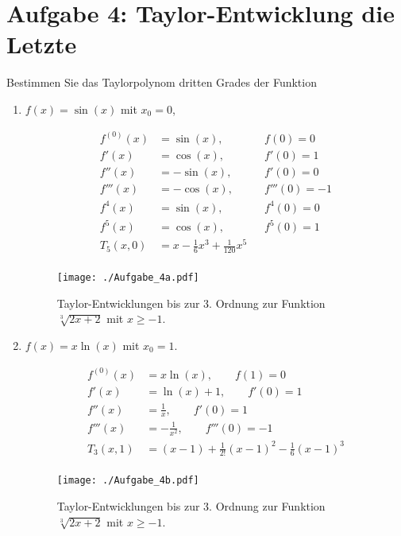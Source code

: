 \documentclass[11pt,a4paper, parskip=half ]{report}
\begin{document}
  \section*{Aufgabe 4:  Taylor-Entwicklung die Letzte}
  Bestimmen Sie das Taylorpolynom dritten Grades der Funktion \begin{enumerate}
    \item $f(x) = \sin(x)$ mit $x_0 = 0$,
    
    \vspace{20pt}
  \begin{align*}
  f^{(0)}(x) &= \sin(x), \qquad &f(0) = 0 \\ 
  f'(x)      &= \cos(x), \qquad &f'(0) = 1 \\
  f''(x)     &= -\sin(x), \qquad &f'(0) = 0 \\
  f'''(x)    &= -\cos(x), \qquad &f'''(0) = -1 \\
  f^{4}(x)    &= \sin(x), \qquad &f^{4}(0) = 0 \\
  f^{5}(x)    &= \cos(x), \qquad &f^{5}(0) = 1 \\
  T_5 (x, 0) &= x - \frac{1}{6} x^3 + \frac{1}{120} x^5  &\\
  \end{align*}

  \begin{figure}
    \centering
    \texttt{[image: ./Aufgabe\_4a.pdf]}
    \caption{Taylor-Entwicklungen bis zur 3. Ordnung zur Funktion $\sqrt[3]{2x+2}$ mit $x\geq -1$.}
    \label{fig:feynman2}
  \end{figure}

    \item $f(x) = x \ln(x)$ mit $x_0 = 1$. 
    
    \vspace{20pt}
    \begin{align*}
    f^{(0)}(x) &= x \ln(x), \qquad f(1) = 0 \\ 
    f'(x)      &= \ln(x) + 1, \qquad f'(0) = 1 \\
    f''(x)     &= \frac{1}{x}, \qquad f'(0) = 1 \\
    f'''(x)    &= -\frac{1}{x^2} , \qquad f'''(0) = -1 \\
    T_3 (x, 1) &= (x -1) + \frac{1}{2!} (x-1)^2 - \frac{1}{6} (x-1)^3 \\
    \end{align*}

    \begin{figure}
      \centering
      \texttt{[image: ./Aufgabe\_4b.pdf]}
      \caption{Taylor-Entwicklungen bis zur 3. Ordnung zur Funktion $\sqrt[3]{2x+2}$ mit $x\geq -1$.}
      \label{fig:feynman2}
    \end{figure}

  \end{enumerate}
\end{document}
